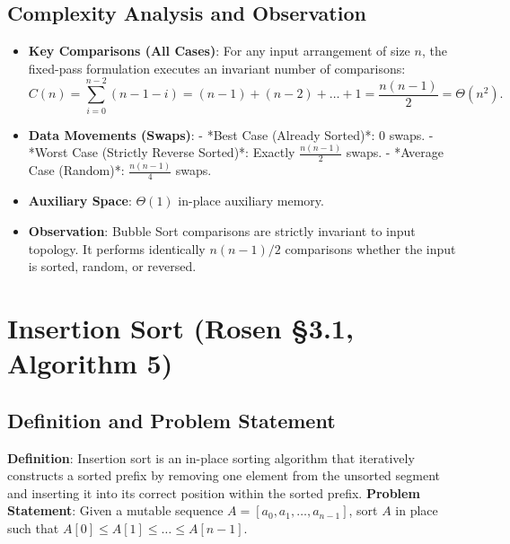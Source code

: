 \documentclass[11pt,a4paper,oneside]{report}
\theoremstyle{definition}
\begin{document}
\subsection{Complexity Analysis and Observation}
\begin{itemize}
    \item \textbf{Key Comparisons (All Cases)}: For any input arrangement of size $n$, the fixed-pass formulation executes an invariant number of comparisons:
    \begin{equation}
        C(n) = \sum_{i=0}^{n-2} (n - 1 - i) = (n - 1) + (n - 2) + \dots + 1 = \frac{n(n - 1)}{2} = \Theta(n^2).
    \end{equation}
    \item \textbf{Data Movements (Swaps)}:
      - *Best Case (Already Sorted)*: 0 swaps.
      - *Worst Case (Strictly Reverse Sorted)*: Exactly $\frac{n(n-1)}{2}$ swaps.
      - *Average Case (Random)*: $\frac{n(n-1)}{4}$ swaps.
    \item \textbf{Auxiliary Space}: $\Theta(1)$ in-place auxiliary memory.
    \item \textbf{Observation}: Bubble Sort comparisons are strictly invariant to input topology. It performs identically $n(n-1)/2$ comparisons whether the input is sorted, random, or reversed.
\end{itemize}

\newpage
\section{Insertion Sort (Rosen \S3.1, Algorithm 5)}

\subsection{Definition and Problem Statement}
\textbf{Definition}: Insertion sort is an in-place sorting algorithm that iteratively constructs a sorted prefix by removing one element from the unsorted segment and inserting it into its correct position within the sorted prefix.
\textbf{Problem Statement}: Given a mutable sequence $A = [a_0, a_1, \dots, a_{n-1}]$, sort $A$ in place such that $A[0] \le A[1] \le \dots \le A[n-1]$.
\end{document}
